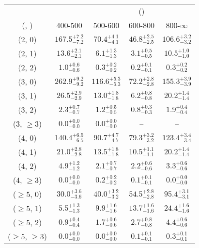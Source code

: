 \begin{table}[h!]
\tiny
\centering
{}
\begin{tabular}
{ccccc}
	\hline\hline
&	& \multicolumn{4}{c}{\scalht (\gev)} \\ 
	 (\njet,  \nb) & 400-500 & 500-600 & 600-800 & 800-$\infty$ \\ [0.8ex] 
\hline
	(2, 0) & $167.5^{+ 7.2 }_{- 7.2 }$ & $70.4^{+ 4.1 }_{- 4.1 }$ & $46.8^{+ 2.5 }_{- 2.5 }$ & $106.6^{+ 3.2 }_{- 3.2 }$ \\[0.5ex] 
	(2, 1) & $13.6^{+ 2.1 }_{- 2.1 }$ & $6.1^{+ 1.3 }_{- 1.3 }$ & $3.1^{+ 0.5 }_{- 0.5 }$ & $10.5^{+ 1.0 }_{- 1.0 }$ \\[0.5ex] 
	(2, 2) & $1.0^{+ 0.6 }_{- 0.6 }$ & $0.3^{+ 0.2 }_{- 0.2 }$ & $0.2^{+ 0.1 }_{- 0.1 }$ & $0.3^{+ 0.2 }_{- 0.2 }$ \\[0.5ex] 
	(3, 0) & $262.9^{+ 9.2 }_{- 9.2 }$ & $116.6^{+ 5.3 }_{- 5.3 }$ & $72.2^{+ 2.8 }_{- 2.8 }$ & $155.3^{+ 3.9 }_{- 3.9 }$ \\[0.5ex] 
	(3, 1) & $26.5^{+ 2.9 }_{- 2.9 }$ & $13.0^{+ 1.8 }_{- 1.8 }$ & $6.2^{+ 0.8 }_{- 0.8 }$ & $20.2^{+ 1.4 }_{- 1.4 }$ \\[0.5ex] 
	(3, 2) & $2.3^{+ 0.7 }_{- 0.7 }$ & $1.2^{+ 0.5 }_{- 0.5 }$ & $0.8^{+ 0.3 }_{- 0.3 }$ & $1.9^{+ 0.4 }_{- 0.4 }$ \\[0.5ex] 
	(3, $\ge3$) & $0.0^{+ 0.0 }_{- 0.0 }$ & $0.0^{+ 0.0 }_{- 0.0 }$ & -- & -- \\[0.5ex] 
	(4, 0) & $140.4^{+ 6.5 }_{- 6.5 }$ & $90.7^{+ 4.7 }_{- 4.7 }$ & $79.3^{+ 3.2 }_{- 3.2 }$ & $123.4^{+ 3.4 }_{- 3.4 }$ \\[0.5ex] 
	(4, 1) & $21.0^{+ 2.8 }_{- 2.8 }$ & $13.5^{+ 1.8 }_{- 1.8 }$ & $10.5^{+ 1.1 }_{- 1.1 }$ & $20.2^{+ 1.4 }_{- 1.4 }$ \\[0.5ex] 
	(4, 2) & $4.9^{+ 1.2 }_{- 1.2 }$ & $2.1^{+ 0.7 }_{- 0.7 }$ & $2.2^{+ 0.6 }_{- 0.6 }$ & $3.3^{+ 0.6 }_{- 0.6 }$ \\[0.5ex] 
	(4, $\ge3$) & $0.0^{+ 0.0 }_{- 0.0 }$ & $0.2^{+ 0.2 }_{- 0.2 }$ & $0.1^{+ 0.1 }_{- 0.1 }$ & $0.0^{+ 0.0 }_{- 0.0 }$ \\[0.5ex] 
	($\ge5$, 0) & $30.0^{+ 3.6 }_{- 3.6 }$ & $40.0^{+ 3.2 }_{- 3.2 }$ & $54.5^{+ 2.8 }_{- 2.8 }$ & $95.4^{+ 3.1 }_{- 3.1 }$ \\[0.5ex] 
	($\ge5$, 1) & $5.5^{+ 1.3 }_{- 1.3 }$ & $9.9^{+ 1.6 }_{- 1.6 }$ & $13.7^{+ 1.6 }_{- 1.6 }$ & $24.4^{+ 1.6 }_{- 1.6 }$ \\[0.5ex] 
	($\ge5$, 2) & $0.9^{+ 0.4 }_{- 0.4 }$ & $1.7^{+ 0.6 }_{- 0.6 }$ & $2.7^{+ 0.8 }_{- 0.8 }$ & $4.4^{+ 0.6 }_{- 0.6 }$ \\[0.5ex] 
	($\ge5$, $\ge3$) & $0.0^{+ 0.0 }_{- 0.0 }$ & $0.0^{+ 0.0 }_{- 0.0 }$ & $0.1^{+ 0.1 }_{- 0.1 }$ & $0.3^{+ 0.1 }_{- 0.1 }$ \\[0.5ex] 
	\hline
	\hline
\end{tabular}
\end{table}
